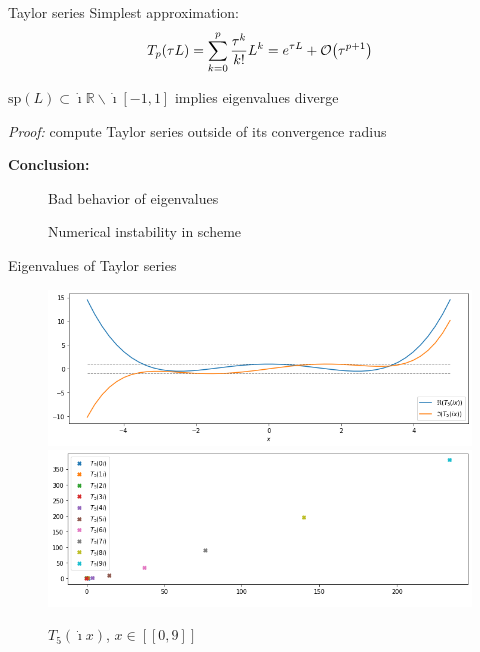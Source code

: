 \documentclass{beamer}
\newcommand{\xmark}{{\color{red}\ding{55}}}
\newcommand{\mbold}[1]{{\textbf{\color{PLB}#1}}}
\newcommand{\I}{\dot{\imath}}
\begin{document}
\begin{frame}{Taylor series}
  Simplest approximation:
  $$
    T_p(\tau L) = \sum_{k=0}^p \frac{\tau^k}{k!}L^k = e^{\tau L} + \order{\tau^{p+1}}
  $$

  \begin{theorem}
    $\text{sp}(L)\subset\I\mathbb{R}\smallsetminus\I[-1,1]$ implies eigenvalues diverge
  \end{theorem}
  \emph{Proof:} compute Taylor series outside of its convergence radius

  \mbold{Conclusion:}
  \begin{description}
    \item[\xmark] Bad behavior of eigenvalues
    \item[\xmark] Numerical instability in scheme
  \end{description}
\end{frame}
\begin{frame}{Eigenvalues of Taylor series}
   \begin{figure}\centering
    \includegraphics[height=0.35\textheight]{img/T5_reim}
    \includegraphics[height=0.35\textheight]{img/T5_ev}
    \caption{$T_5(\I x)$, $x\in[\![0,9]\!]$}
  \end{figure}
\end{frame}
\end{document}
